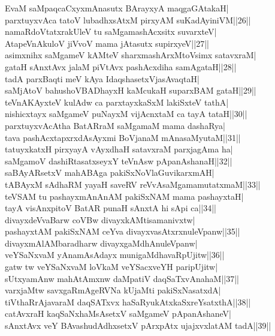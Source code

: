 \documentclass{article}
\begin{document}
EvaM saMpaqcaCxyxmAnasutx BArayxyA maqgaGAtakaH|\\
parxtuyxvAca tatoV lubadhxsAtxM pirxyAM suKadAyiniVM||26||\\
namaRdoVtatxrakUleV tu saMgamashAcxsitx suvarxteV|\\
AtapeVnAkuloV jiVvoV mama jAtasutx supirxyeV||27||\\
asimxnihx saMgameV kAMteV sharxmashArxMtoVsimx satavxraM|\\
gataH sAnxtAvx jalaM piVtAvx pashAcxdiha samAgataH||28||\\
tadA parxBaqti meV kAya IdaqshasetxVjasAvaqtaH|\\
saMjAtoV bahushoVBADhayxH kaMcukaH suparxBAM gataH||29||\\
teVnAKAyxteV kulAdw ca parxtayxkaSxM lakiSxteV tathA|\\
nishicxtayx saMgameV puNayxM vijAcnxtaM ca tayA tataH||30||\\
parxtuyxvAcAtha BatARraM saMgamaM mama dashaRya|\\
tava pashAcxtapxrxdAsAyxmi BoVjanaM mAnasaMyutaM||31||\\
tatuyxkatxH pirxyayA vAyxdhaH satavxraM parxjagAma ha|\\
saMgamoV dashiRtasatxseyxY teVnAsw pApanAshanaH||32||\\
saBAyARsetxV mahABAga pakiSxNoVlaGuvikarxmAH|\\
tABAyxM sAdhaRM yayaH saveRV reVvAsaMgamamutatxmaM||33||\\
teVSAM tu pashayxmAnAnAM pakiSxNAM mama pashayxtaH|\\
tayA visAnxpitoV BatAR punaH sAnxtA hi sApi ca||34||\\
divayxdeVvaBarw coVBw divayxkAMtisamanivxtw|\\
pashayxtAM pakiSxNAM ceYva divayxvasAtxrxnuleVpanw||35||\\
divayxmAlAMbaradharw divayxgaMdhAnuleVpanw|\\
veYSaNxvaM yAnamAsAdayx munigaMdhavaRpUjitw||36||\\
gatw tw veYSaNxvaM loVkaM veYSacxveYH paripUjitw|\\
sUtxyamAnw mahAtAmxnw daMpatiV daqSaTxvAnahaM||37||\\
varxjaMtw savxgaRmAgeRVNa kUjaMti pakiSxNasatxdA|\\
tiVthaRrAjavaraM daqSATxvx haSaRyukAtxkaSxreYsatxthA||38||\\
catAvxraH kaqSaNxhaMsAsetxV saMgameV pApanAshaneV|\\
sAnxtAvx veY BAvashudAdhxsetxV pArxpAtx ujajxvxlatAM tadA||39||\\
\end{document}
